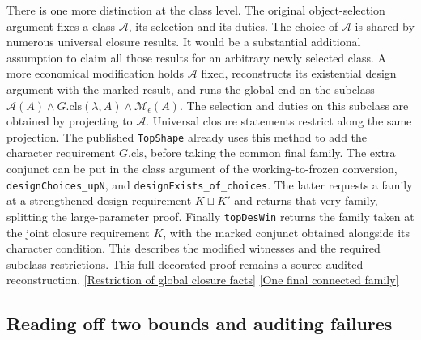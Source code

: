 \documentclass[12pt,letterpaper]{article}
\begin{document}
There is one more distinction at the class level. The original object-selection argument fixes a class \(\mathcal A\), its selection and its duties. The choice of \(\mathcal A\) is shared by numerous universal closure results. It would be a substantial additional assumption to claim all those results for an arbitrary newly selected class. A more economical modification holds \(\mathcal A\) fixed, reconstructs its existential design argument with the marked result, and runs the global end on the subclass \(\mathcal A(A)\wedge G.\mathrm{cls}(\lambda,A)\wedge\mathcal M_\epsilon(A)\). The selection and duties on this subclass are obtained by projecting to \(\mathcal A\). Universal closure statements restrict along the same projection. The published \texttt{TopShape} already uses this method to add the character requirement \(G.\mathrm{cls}\), before taking the common final family. The extra conjunct can be put in the class argument of the working-to-frozen conversion, \texttt{designChoices\_upN}, and \texttt{designExists\_of\_choices}. The latter requests a family at a strengthened design requirement \(K\sqcup K'\) and returns that very family, splitting the large-parameter proof. Finally \texttt{topDesWin} returns the family taken at the joint closure requirement \(K\), with the marked conjunct obtained alongside its character condition. This describes the modified witnesses and the required subclass restrictions. This full decorated proof remains a source-audited reconstruction.
\href{https://github.com/nousentllc/riemann-hypothesis/blob/40e56bab026552e089d7afcfeff08d2defb9c005/src/Development/AutomorphicArithmetic/ThetaCorrespondence/ThetaPairLifts/ThirdPlaceSeries/TopShape.lean#L47-L55}{[Restriction of global closure facts]}
\href{https://github.com/nousentllc/riemann-hypothesis/blob/40e56bab026552e089d7afcfeff08d2defb9c005/src/Development/AutomorphicArithmetic/CharacterBoxes/DesWin.lean#L22-L31}{[One final connected family]}

\subsection{Reading off two bounds and auditing failures}
\end{document}

